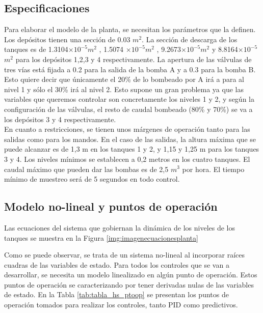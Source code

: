 	\subsection{Especificaciones}
		
		Para elaborar el modelo de la planta, se necesitan los parámetros que la definen. Los depósitos tienen una sección de  0.03 $m^2$. La sección de descarga de los tanques es de 1.3104$\times 10^{-5}$$m^2$ , 1.5074 $\times 10^{-5}$$m^2$ , 9.2673$\times 10^{-5}$$m^2$ y 8.8164$\times 10^{-5}$$m^2$  para los depósitos 1,2,3 y 4 respectivamente. La apertura de las válvulas de tres vías está fijada a 0.2 para la salida de la bomba A y a 0.3 para la bomba B. Esto quiere decir que únicamente el 20\% de lo bombeado por A irá a para al nivel 1 y sólo el 30\% irá al nivel 2. Esto supone un gran problema ya que las variables que queremos controlar son concretamente los niveles 1 y 2, y según la configuración de las válvulas, el resto de caudal bombeado (80\% y 70\%) se va a los depósitos 3 y 4 respectivamente.\\
		En cuanto a restricciones, se tienen unos márgenes de operación tanto para las salidas como para los mandos. En el caso de las salidas, la altura máxima que se puede alcanzar es de 1,3 m en los tanques 1 y 2, y 1,15 y 1,25 m para los tanques 3 y 4. Los niveles mínimos se establecen a 0,2 metros en los cuatro tanques. El caudal máximo que pueden dar las bombas es de 2,5 $m^3$ por hora. El tiempo mínimo de muestreo será de 5 segundos en todo control.
		
	\subsection{Modelo no-lineal y puntos de operación}
		Las ecuaciones del sistema que gobiernan la dinámica de los niveles de los tanques se muestra en la Figura \ref{img:imagenecuacionesplanta}\\
		
		
		Como se puede observar, se trata de un sistema no-lineal al incorporar raíces cuadras de las variables de estado. Para todos los controles que se van a desarrollar, se necesita un modelo linealizado en algún punto de operación. Estos puntos de operación se caracterizando por tener derivadas nulas de las variables de estado. En la Tabla \ref{tab:tabla_hs_ptoop} se presentan los puntos de operación tomados para realizar los controles, tanto PID como predictivos. 
		
